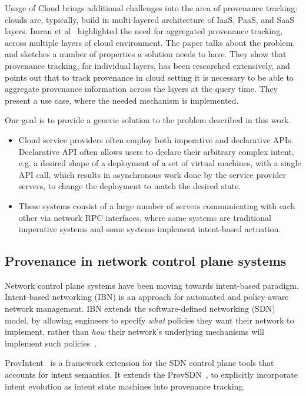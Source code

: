 Usage of Cloud brings additional challenges into the area of provenance tracking: clouds are, typically, build in multi-layered architecture of IaaS, PaaS, and SaaS layers. Imran et al~\cite{imran2018aggregated} highlighted the need for aggregated provenance tracking, across multiple layers of cloud environment. The paper talks about the problem, and sketches a number of properties a solution needs to have. They show that provenance tracking, for individual layers, has been researched extensively, and points out that to track provenance in cloud setting it is necessary to be able to aggregate provenance information across the layers at the query time. They present a use case, where the needed mechanism is implemented.

Our goal is to provide a generic solution to the problem described in this work.
%
\begin{itemize}
    \item Cloud service providers often employ both imperative and declarative APIs. Declarative API often allows users to declare their arbitrary complex intent, e.g. a desired shape of a deployment of a set of virtual machines, with a single API call, which results in asynchronous work done by the service provider servers, to change the deployment to match the desired state.
    \item These systems consist of a large number of servers communicating with each other via network RPC interfaces, where some systems are traditional imperative systems and some systems implement intent-based actuation.
\end{itemize}

\subsection{Provenance in network control plane systems}

Network control plane systems have been moving towards intent-based paradigm. Intent-based networking (IBN) is an approach for automated and policy-aware network management. IBN extends the software-defined networking (SDN) model, by allowing engineers to specify \textit{what} policies they want their network to implement, rather than \textit{how} their network’s underlying mechanisms will implement such policies~\cite{concepts-network-intent-sivakumar2017}.

ProvIntent~\cite{intent-network-ujcich2020provenance} is a framework extension for the SDN control plane tools that accounts for intent semantics. It extends the ProvSDN~\cite{provsdn-ujcich2018}, to explicitly incorporate intent evolution as intent state machines into provenance tracking.

